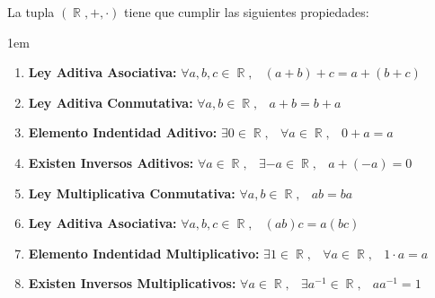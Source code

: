 \documentclass[12pt, fleqn]{report}                             %
\newenvironment{SmallIndentation}[1][0.75em]                    %
        {\begin{adjustwidth}{#1}{}\begin{footnotesize}}             %
        {\end{footnotesize}\end{adjustwidth}}                       %
\DeclareMathOperator \Space     {\quad}                         %
\DeclareMathOperator \MiniSpace {\;}                            %
\theoremstyle{break}                                            %
\DeclareMathOperator \Reals        {\mathbb{R}}                 %
\begin{document}
                La tupla $(\Reals, +, \cdot)$ tiene que cumplir las siguientes
                propiedades:

                \begin{SmallIndentation}[1em]

                    \begin{enumerate}
                    
                        \item 
                            \textbf{Ley Aditiva Asociativa:}
                            $\forall a, b, c \in \Reals, \MiniSpace
                                (a + b) + c = a + (b + c)$

                        \item 
                            \textbf{Ley Aditiva Conmutativa:}
                            $\forall a, b \in \Reals, \MiniSpace
                                    a + b = b + a$

                        \item 
                            \textbf{Elemento Indentidad Aditivo:}
                            $\exists 0 \in \Reals, \MiniSpace
                                \forall a \in \Reals, \MiniSpace 0 + a = a$

                        \item 
                            \textbf{Existen Inversos Aditivos:}
                            $\forall a \in \Reals, \MiniSpace
                                    \exists -a \in \Reals, \MiniSpace
                                        a + (-a) = 0$

                        \item 
                            \textbf{Ley Multiplicativa Conmutativa:}
                            $\forall a, b \in \Reals, \MiniSpace
                                    ab = ba$

                        \item 
                            \textbf{Ley Aditiva Asociativa:}
                            $\forall a, b, c \in \Reals, \MiniSpace
                                (ab)c = a(bc)$

                        \item 
                            \textbf{Elemento Indentidad Multiplicativo:}
                            $\exists 1 \in \Reals, \MiniSpace
                                \forall a \in \Reals, \MiniSpace 1 \cdot a = a$

                        \item 
                            \textbf{Existen Inversos Multiplicativos:}
                            $\forall a \in \Reals, \MiniSpace
                                    \exists a^{-1} \in \Reals, \MiniSpace
                                        a a^{-1} = 1$


\end{enumerate}
\end{SmallIndentation}
\end{document}
